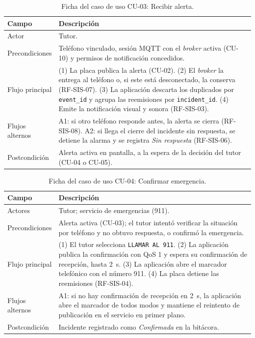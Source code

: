 \documentclass[12pt,a4paper,oneside]{book}
\theoremstyle{plain}
\theoremstyle{definition}
\theoremstyle{remark}
\begin{document}
\begin{table}[H]
\centering
\caption{Ficha del caso de uso CU-03: Recibir alerta.}
\label{tab:cu-03}
\small
\begin{tabular}{L{3.0cm}L{9.0cm}}
\toprule
\textbf{Campo} & \textbf{Descripción} \\
\midrule
Actor & Tutor. \\
\addlinespace
Precondiciones & Teléfono vinculado, sesión MQTT con el \textit{broker} activa (CU-10) y permisos de notificación concedidos. \\
\addlinespace
Flujo principal & (1) La placa publica la alerta (CU-02). (2) El \textit{broker} la entrega al teléfono o, si este está desconectado, la conserva (RF-SIS-07). (3) La aplicación descarta los duplicados por \texttt{event\_id} y agrupa las reemisiones por \texttt{incident\_id}. (4) Emite la notificación visual y sonora (RF-SIS-03). \\
\addlinespace
Flujos alternos & A1: si otro teléfono responde antes, la alerta se cierra (RF-SIS-08). A2: si llega el cierre del incidente sin respuesta, se detiene la alarma y se registra \textit{Sin respuesta} (RF-SIS-06). \\
\addlinespace
Postcondición & Alerta activa en pantalla, a la espera de la decisión del tutor (CU-04 o CU-05). \\
\bottomrule
\end{tabular}
\end{table}

\begin{table}[H]
\centering
\caption{Ficha del caso de uso CU-04: Confirmar emergencia.}
\label{tab:cu-04}
\small
\begin{tabular}{L{3.0cm}L{9.0cm}}
\toprule
\textbf{Campo} & \textbf{Descripción} \\
\midrule
Actores & Tutor; servicio de emergencias (911). \\
\addlinespace
Precondiciones & Alerta activa (CU-03); el tutor intentó verificar la situación por teléfono y no obtuvo respuesta, o confirmó la emergencia. \\
\addlinespace
Flujo principal & (1) El tutor selecciona \texttt{LLAMAR AL 911}. (2) La aplicación publica la confirmación con QoS 1 y espera su confirmación de recepción, hasta 2~s. (3) La aplicación abre el marcador telefónico con el número 911. (4) La placa detiene las reemisiones (RF-SIS-04). \\
\addlinespace
Flujos alternos & A1: si no hay confirmación de recepción en 2~s, la aplicación abre el marcador de todos modos y mantiene el reintento de publicación en el servicio en primer plano. \\
\addlinespace
Postcondición & Incidente registrado como \textit{Confirmada} en la bitácora. \\
\bottomrule
\end{tabular}
\end{table}
\end{document}
